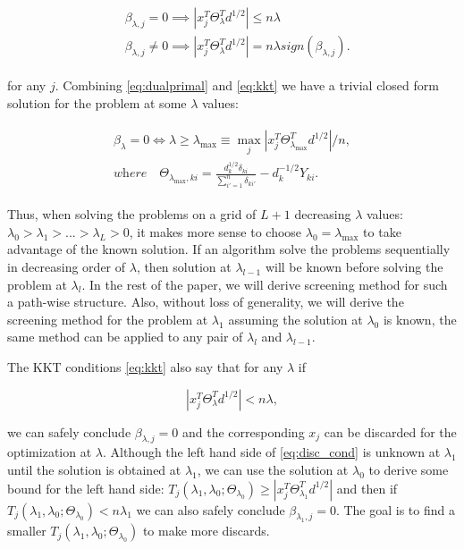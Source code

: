 \begin{gather}
    \label{eq:kkt}
    \begin{aligned}&\beta_{\lambda,j}=0\implies\left|x_j^T\Theta_\lambda^Td^{1/2}\right|\leq n\lambda\\
    & \beta_{\lambda,j}\neq0\implies\left|x_j^T\Theta_\lambda^Td^{1/2}\right|= n\lambda\textit{sign}(\beta_{\lambda,j}).
    \end{aligned}
\end{gather}

for any $j$. Combining \eqref{eq:dualprimal} and \eqref{eq:kkt} we have a trivial closed form solution for the problem at some $\lambda$ values:

\begin{gather}
    \label{eq:lammax}
    \begin{aligned}
        \beta_\lambda=0\iff \lambda \geq \lambda_{\max}\equiv \max_j \left|x_j^T\Theta^T_{\lambda_{\max}}d^{1/2}\right|/n,\\
        \textit{where}\quad\Theta_{\lambda_{\max},ki}=\frac{d_k^{1/2}\delta_{ki}}{\sum_{i'=1}^n\delta_{ki'}}-d_k^{-1/2}Y_{ki}.
    \end{aligned}
\end{gather}

Thus, when solving the problems on a grid of $L+1$ decreasing $\lambda$ values: $\lambda_0>\lambda_1>...>\lambda_L>0$, it makes more sense to choose $\lambda_0= \lambda_{\max}$ to take advantage of the known solution. If an algorithm solve the problems sequentially in decreasing order of $\lambda$, then solution at $\lambda_{l-1}$ will be known before solving the problem at $\lambda_l$. In the rest of the paper, we will derive screening method for such a path-wise structure. Also, without loss of generality, we will derive the screening method for the problem at $\lambda_1$ assuming the solution at $\lambda_0$ is known, the same method can be applied to any pair of $\lambda_{l}$ and $\lambda_{l-1}$.

The KKT conditions \eqref{eq:kkt} also say that for any $\lambda$ if 

\begin{equation}
    \label{eq:disc_cond}
    |x_j^T\Theta_{\lambda}^Td^{1/2}|<n\lambda,
\end{equation}

we can safely conclude $\beta_{\lambda,j}=0$ and the corresponding $x_j$ can be discarded for the optimization at $\lambda$. Although the left hand side of \eqref{eq:disc_cond} is unknown at $\lambda_1$ until the solution is obtained at $\lambda_1$, we can use the solution at $\lambda_{0}$ to derive some bound for the left hand side: $T_j(\lambda_{1},\lambda_{0};\Theta_{\lambda_0})\geq |x_j^T\Theta_{\lambda_1}^Td^{1/2}|$ and then if $T_j(\lambda_{1},\lambda_{0};\Theta_{\lambda_0})<n\lambda_1$ we can also safely conclude $\beta_{\lambda_1,j}=0$. The goal is to find a smaller $T_j(\lambda_{1},\lambda_{0};\Theta_{\lambda_0})$ to make more discards.

